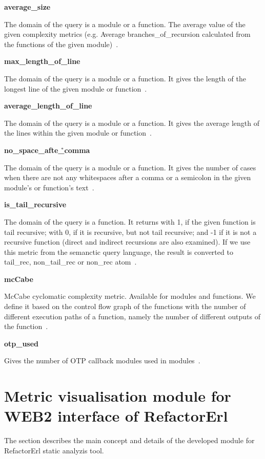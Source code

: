 \textbf{average\_size}

The domain of the query is a module or a function. The average value of the given complexity metrics (e.g. Average branches\_of\_recursion calculated from the functions of the given module)~\cite{refactorerl}.

\textbf{max\_length\_of\_line}

The domain of the query is a module or a function. It gives the length of the longest line of the given module or function~\cite{refactorerl}.

\textbf{average\_length\_of\_line}

The domain of the query is a module or a function. It gives the average length of the lines within the given module or function~\cite{refactorerl}.

\textbf{no\_space\_afte\r\_comma}

The domain of the query is a module or a function. It gives the number of cases when there are not any whitespaces after a comma or a semicolon in the given module's or function's text~\cite{refactorerl}.

\textbf{is\_tail\_recursive}

The domain of the query is a function. It returns with 1, if the given function is tail recursive; with 0, if it is recursive, but not tail recursive; and -1 if it is not a recursive function (direct and indirect recursions are also examined). If we use this metric from the
semanctic query language, the result is converted to tail\_rec, non\_tail\_rec or non\_rec atom~\cite{refactorerl}.

\textbf{mcCabe}

McCabe cyclomatic complexity metric. Available for modules and functions. We define it based on the control flow graph of the functions with the number of different execution paths of a function, namely the number of different outputs of the function~\cite{refactorerl}.

\textbf{otp\_used}

Gives the number of OTP callback modules used in modules~\cite{refactorerl}.

\section{Metric visualisation module for WEB2 interface of RefactorErl}

The section describes the main concept and details of the developed module for RefactorErl static analyzis tool.

